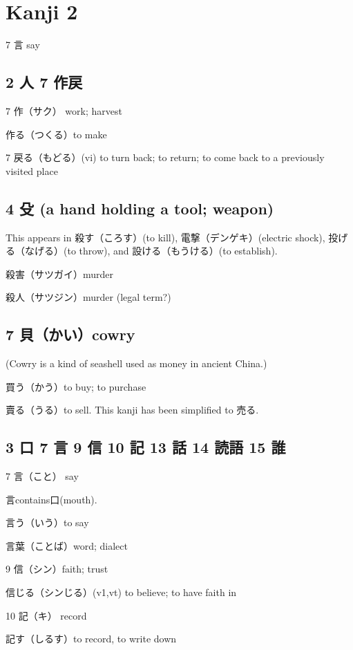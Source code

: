 \chapter{Kanji 2}

7 言 say

\section{2 人 7 作戻}

7 作（サク） work; harvest

作る（つくる）to make

7 戻る（もどる）(vi) to turn back; to return;
to come back to a previously visited place

\section{4 殳 (a hand holding a tool; weapon)}

This appears in
殺す（ころす）(to kill),
電撃（デンゲキ）(electric shock),
投げる（なげる）(to throw),
and 設ける（もうける）(to establish).

殺害（サツガイ）murder

殺人（サツジン）murder (legal term?)

\section{7 貝（かい）cowry}

(Cowry is a kind of seashell used as money in ancient China.)

買う（かう）to buy; to purchase

賣る（うる）to sell.
This kanji has been simplified to 売る.

\section{3 口 7 言 9 信 10 記 13 話 14 読語 15 誰}

7 言（こと） say

言contains口(mouth).

言う（いう）to say

言葉（ことば）word; dialect

9 信（シン）faith; trust

信じる（シンじる）(v1,vt) to believe; to have faith in

10 記（キ） record

記す（しるす）to record, to write down

